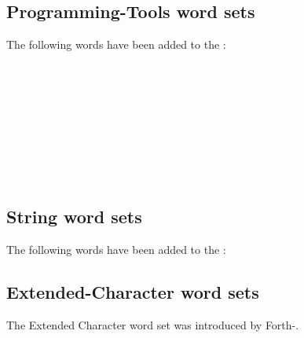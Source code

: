 \subsection{Programming-Tools word sets}
\label{diff:12:tools}
The following words have been added to the :

\begin{minipage}[t]{0.45\linewidth}
	 \\
	 \\
	 \\
	 \\
\end{minipage}
\hfill
\begin{minipage}[t]{0.45\linewidth}
	 \\
	 \\
	 \\
\end{minipage}

\subsection[Search-Order word sets]{}

\subsection{String word sets}
The following words have been added to the :

\begin{minipage}[t]{0.3\linewidth}
\end{minipage}
\hfill
\begin{minipage}[t]{0.3\linewidth}
\end{minipage}
\hfill
\begin{minipage}[t]{0.3\linewidth}
\end{minipage}

\subsection{Extended-Character word sets}
The Extended Character word set was introduced by Forth-\snapshot.

